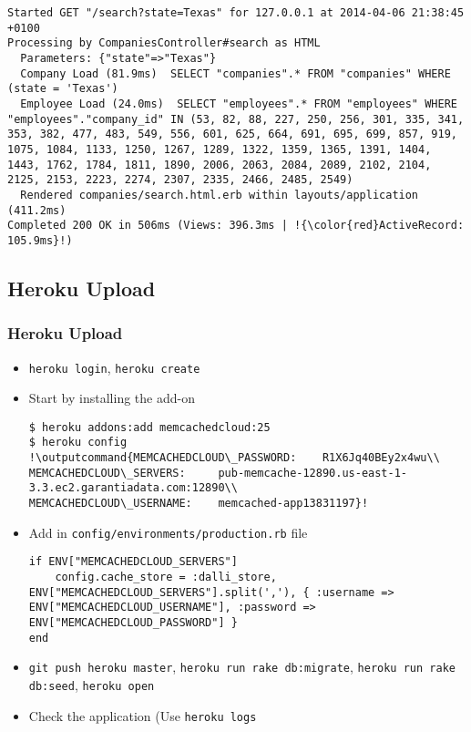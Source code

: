 \documentclass{beamer}
\newcommand{\outputcommand}[1]{\color{darkgreen}{#1}}
\begin{document}
\begin{frame}
\begin{itemize}
\lstset{language=shell}
\begin{lstlisting}[escapechar=!]
Started GET "/search?state=Texas" for 127.0.0.1 at 2014-04-06 21:38:45 +0100
Processing by CompaniesController#search as HTML
  Parameters: {"state"=>"Texas"}
  Company Load (81.9ms)  SELECT "companies".* FROM "companies" WHERE (state = 'Texas')
  Employee Load (24.0ms)  SELECT "employees".* FROM "employees" WHERE "employees"."company_id" IN (53, 82, 88, 227, 250, 256, 301, 335, 341, 353, 382, 477, 483, 549, 556, 601, 625, 664, 691, 695, 699, 857, 919, 1075, 1084, 1133, 1250, 1267, 1289, 1322, 1359, 1365, 1391, 1404, 1443, 1762, 1784, 1811, 1890, 2006, 2063, 2084, 2089, 2102, 2104, 2125, 2153, 2223, 2274, 2307, 2335, 2466, 2485, 2549)
  Rendered companies/search.html.erb within layouts/application (411.2ms)
Completed 200 OK in 506ms (Views: 396.3ms | !{\color{red}ActiveRecord: 105.9ms}!)
\end{lstlisting}

\end{itemize}
\end{frame}
\subsection{Heroku Upload}
\begin{frame}[fragile]
\frametitle{Heroku Upload}
\begin{itemize}
\item \texttt{heroku login}, \texttt{heroku create}

\item Start by installing the add-on
\lstset{language=shell}
\begin{lstlisting}[escapechar=!]
$ heroku addons:add memcachedcloud:25
$ heroku config
!\outputcommand{MEMCACHEDCLOUD\_PASSWORD:    R1X6Jq40BEy2x4wu\\
MEMCACHEDCLOUD\_SERVERS:     pub-memcache-12890.us-east-1-3.3.ec2.garantiadata.com:12890\\
MEMCACHEDCLOUD\_USERNAME:    memcached-app13831197}!
\end{lstlisting}

\item Add in \texttt{config/environments/production.rb} file

\lstset{language=Ruby, style=eclipse}
\begin{lstlisting}
if ENV["MEMCACHEDCLOUD_SERVERS"]
    config.cache_store = :dalli_store, ENV["MEMCACHEDCLOUD_SERVERS"].split(','), { :username => ENV["MEMCACHEDCLOUD_USERNAME"], :password => ENV["MEMCACHEDCLOUD_PASSWORD"] }
end
\end{lstlisting}

\item \texttt{git push heroku master}, \texttt{heroku run rake db:migrate}, \texttt{heroku run rake db:seed},  \texttt{heroku open}
\item Check the application (Use \texttt{heroku logs}

\end{itemize}
\end{frame}
\end{document}
